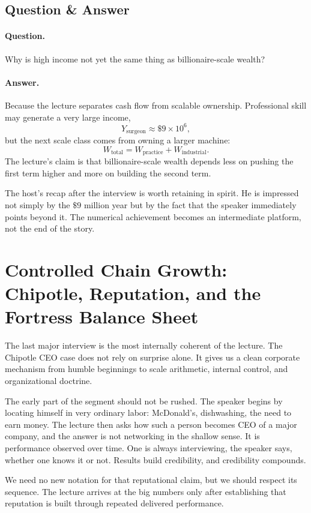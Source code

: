 \subsection{Question \& Answer}

\paragraph{Question.} Why is high income not yet the same thing as billionaire-scale wealth?

\paragraph{Answer.} Because the lecture separates cash flow from scalable ownership. Professional skill may generate a very large income,
\[
Y_{\mathrm{surgeon}}\approx \$9\times 10^6,
\]
but the next scale class comes from owning a larger machine:
\[
W_{\mathrm{total}} = W_{\mathrm{practice}} + W_{\mathrm{industrial}}.
\]
The lecture's claim is that billionaire-scale wealth depends less on pushing the first term higher and more on building the second term.

The host's recap after the interview is worth retaining in spirit. He is impressed not simply by the \(\$9\) million year but by the fact that the speaker immediately points beyond it. The numerical achievement becomes an intermediate platform, not the end of the story.

\section{Controlled Chain Growth: Chipotle, Reputation, and the Fortress Balance Sheet}

The last major interview is the most internally coherent of the lecture. The Chipotle CEO case does not rely on surprise alone. It gives us a clean corporate mechanism from humble beginnings to scale arithmetic, internal control, and organizational doctrine.

The early part of the segment should not be rushed. The speaker begins by locating himself in very ordinary labor: McDonald's, dishwashing, the need to earn money. The lecture then asks how such a person becomes CEO of a major company, and the answer is not networking in the shallow sense. It is performance observed over time. One is always interviewing, the speaker says, whether one knows it or not. Results build credibility, and credibility compounds.

We need no new notation for that reputational claim, but we should respect its sequence. The lecture arrives at the big numbers only after establishing that reputation is built through repeated delivered performance.

